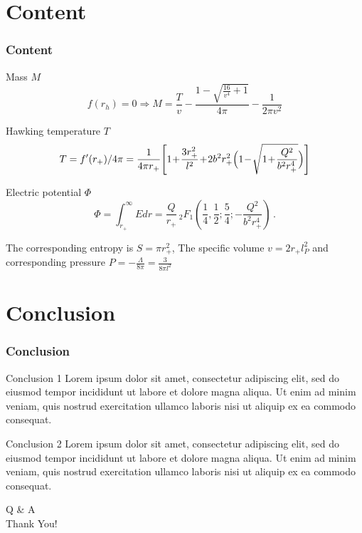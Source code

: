 \section{Content}\label{sec:content}
\begin{frame}
\frametitle{\textbf{Content}}
\begin{block}{Mass $M$}
\begin{equation}
    f(r_h) = 0 \Longrightarrow M = \frac{T}{v}-\frac{1-\sqrt{\frac{16}{v^4}+1}}{4 \pi }-\frac{1}{2 \pi  v^2}
\end{equation}
\end{block}
    
\begin{exampleblock}{Hawking temperature $T$}
\begin{equation}\label{eq:T}
    T = f^{\prime}(r_+) / 4 \pi = \frac{1}{4\pi r_+}\!\left[1\!+\!\frac{3r_+^2}{l^2}\!+\!2b^2 r_+^2\Bigl(1\!-\!\sqrt{1\!+\!\frac{Q^2}{b^2 r_+^4}}\Bigr)\right]
\end{equation}
\end{exampleblock}
    
\begin{alertblock}{Electric potential $\Phi$}
\begin{equation}
    \Phi=\int_{r_+}^\infty E dr
    =\frac{Q}{r_+}\,{}_2 F_1\!\left(\frac{1}{4},\frac{1}{2};\frac{5}{4};-\frac{Q^2}{b^2 r_+^4}\right)\,.
\end{equation}
\end{alertblock}
    
The corresponding entropy is $S = \pi r_+^2$, The specific volume $v = 2 r_+ l_P^2$ and corresponding pressure $P = - \frac{\Lambda}{8 \pi} = \frac{3}{8 \pi l^2}$
\end{frame}

\section{Conclusion}\label{sec:conclusion}
\begin{frame}
\frametitle{Conclusion}
\begin{block}{Conclusion 1}
    Lorem ipsum dolor sit amet, consectetur adipiscing elit, sed do eiusmod tempor incididunt ut labore et dolore magna aliqua.
    Ut enim ad minim veniam, quis nostrud exercitation ullamco laboris nisi ut aliquip ex ea commodo consequat.
\end{block}

\begin{exampleblock}{Conclusion 2}
    Lorem ipsum dolor sit amet, consectetur adipiscing elit, sed do eiusmod tempor incididunt ut labore et dolore magna aliqua.
    Ut enim ad minim veniam, quis nostrud exercitation ullamco laboris nisi ut aliquip ex ea commodo consequat. 
\end{exampleblock}
\end{frame}

\LogoOn
\begin{frame}[noframenumbering]
\centering
\fontsize{40}{50}\selectfont Q \& A\\Thank You!
\end{frame}
\LogoOff

